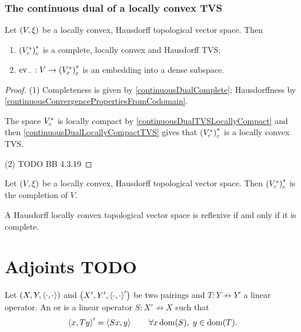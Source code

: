 \subsubsection{The continuous dual of a locally convex TVS}
\begin{proposition}
Let $\sSet{V,\xi}$ be a locally convex, Hausdorff topological vector space. Then
\begin{enumerate}
\item ${({V}^*_c)}^*_c$ is a complete, locally convex and Hausdorff TVS;
\item $\operatorname{ev}_-: V\to {({V}^*_c)}^*_c$ is an embedding into a dense subspace.
\end{enumerate}
\end{proposition}
\begin{proof}
(1) Completeness is given by \ref{continuousDualComplete}; Hausdorffness by \ref{continuousConvergencePropertiesFromCodomain}.

The space ${V}^*_c$ is locally compact by \ref{continuousDualTVSLocallyCompact} and then \ref{continuousDualLocallyCompactTVS} gives that ${({V}^*_c)}^*_c$ is a locally convex TVS.

(2) TODO BB 4.3.19 
\end{proof}
\begin{corollary}
Let $\sSet{V,\xi}$ be a locally convex, Hausdorff topological vector space. Then ${({V}^*_c)}^*_c$ is the completion of $V$.
\end{corollary}
\begin{corollary}
A Hausdorff locally convex topological vector space is reflexive \textup{if and only if} it is complete.
\end{corollary}

\section{Adjoints TODO}
\begin{definition}
Let $\sSet{X,Y,\pair{\cdot,\cdot}}$ and $\sSet{X',Y',\pair{\cdot,\cdot}'}$ be two pairings and $T: Y\not\to Y'$ a linear operator. An  or  is a linear operator $S: X'\not\to X$ such that
\[ \left\langle x, Ty \right\rangle' = \left\langle Sx, y \right\rangle \qquad \forall x\operatorname{dom}(S), \; y\in\operatorname{dom}(T). \]
\end{definition}

